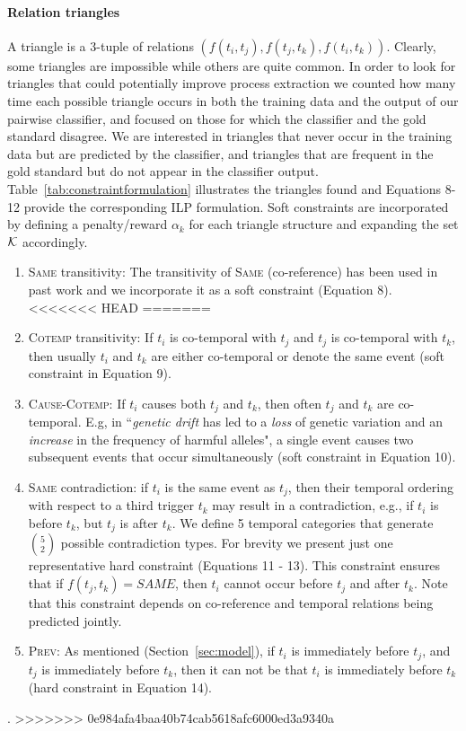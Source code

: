 \paragraph{Relation triangles} 
A triangle is a 3-tuple of relations $(f(t_i,t_j),f(t_j,t_k),f(t_i,t_k))$. Clearly, some triangles are impossible while others are quite common. In order to look for triangles that could potentially improve process extraction we counted how many time each possible triangle occurs in both the training data and the output of our pairwise classifier, and focused on those for which the classifier and the gold standard disagree. We are interested in triangles that never occur in the training data but are predicted by the classifier, and triangles that are frequent in the gold standard but do not appear in the classifier output. Table~\ref{tab:constraintformulation} illustrates the triangles found and Equations 8-12 provide the corresponding ILP formulation. Soft constraints are incorporated by defining a penalty/reward $\alpha_k$ for each triangle structure and expanding the set $\mathcal{K}$ accordingly. 
\begin{enumerate}[itemsep=0pt,topsep=0pt] 
\item \textsc{Same} transitivity: The transitivity of \textsc{Same} (co-reference) has been used in past work \cite{Finkel08} and we incorporate it as a soft constraint (Equation 8).
<<<<<<< HEAD
=======
\item \textsc{Cotemp} transitivity:  If $t_i$ is co-temporal with $t_j$ and $t_j$ is co-temporal with $t_k$, then usually $t_i$ and $t_k$ are either co-temporal or denote the same event (soft constraint in Equation 9).
\item \textsc{Cause}-\textsc{Cotemp}: If $t_i$ causes both $t_j$ and $t_k$, then often $t_j$ and $t_k$ are co-temporal. E.g, in ``\emph{genetic drift} has led to a \emph{loss} of genetic variation and an \emph{increase} in the frequency of harmful alleles", a single event causes two subsequent events that occur simultaneously (soft constraint in Equation 10).
\item \textsc{Same} contradiction: if $t_i$ is the same event as  $t_j$, then their temporal ordering with respect to a third trigger $t_k$ may result in a contradiction, e.g., if $t_i$ is before $t_k$, but $t_j$ is after $t_k$. We define 5 temporal categories that generate $5 \choose 2$ possible contradiction types. For brevity we present just one representative hard constraint (Equations 11 - 13). This constraint ensures that if $f(t_j,t_k) = SAME$, then $t_i$ cannot occur before $t_j$ and after $t_k$. Note that this constraint depends on co-reference and temporal relations being predicted jointly.
\item \textsc{Prev}: As mentioned (Section~\ref{sec:model}), if $t_i$ is immediately before $t_j$, and $t_j$ is immediately before $t_k$, then it can not be that $t_i$ is immediately before $t_k$ (hard constraint in Equation 14).
\end{enumerate}.
>>>>>>> 0e984afa4baa40b74cab5618afc6000ed3a9340a

